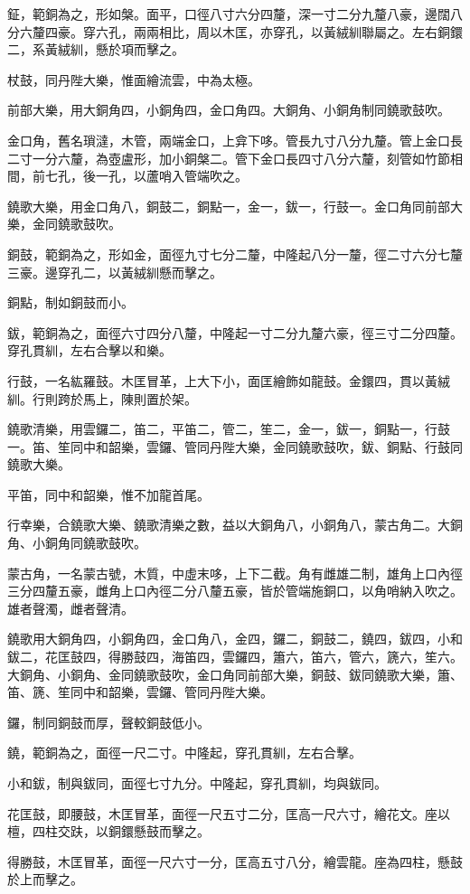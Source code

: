 \begin{pinyinscope}
鉦，範銅為之，形如槃。面平，口徑八寸六分四釐，深一寸二分九釐八豪，邊闊八分六釐四豪。穿六孔，兩兩相比，周以木匡，亦穿孔，以黃絨紃聯屬之。左右銅鐶二，系黃絨紃，懸於項而擊之。

杖鼓，同丹陛大樂，惟面繪流雲，中為太極。

前部大樂，用大銅角四，小銅角四，金口角四。大銅角、小銅角制同鐃歌鼓吹。

金口角，舊名瑣澾，木管，兩端金口，上弇下哆。管長九寸八分九釐。管上金口長二寸一分六釐，為壺盧形，加小銅槃二。管下金口長四寸八分六釐，刻管如竹節相間，前七孔，後一孔，以蘆哨入管端吹之。

鐃歌大樂，用金口角八，銅鼓二，銅點一，金一，鈸一，行鼓一。金口角同前部大樂，金同鐃歌鼓吹。

銅鼓，範銅為之，形如金，面徑九寸七分二釐，中隆起八分一釐，徑二寸六分七釐三豪。邊穿孔二，以黃絨紃懸而擊之。

銅點，制如銅鼓而小。

鈸，範銅為之，面徑六寸四分八釐，中隆起一寸二分九釐六豪，徑三寸二分四釐。穿孔貫紃，左右合擊以和樂。

行鼓，一名紘羅鼓。木匡冒革，上大下小，面匡繪飾如龍鼓。金鐶四，貫以黃絨紃。行則跨於馬上，陳則置於架。

鐃歌清樂，用雲鑼二，笛二，平笛二，管二，笙二，金一，鈸一，銅點一，行鼓一。笛、笙同中和韶樂，雲鑼、管同丹陛大樂，金同鐃歌鼓吹，鈸、銅點、行鼓同鐃歌大樂。

平笛，同中和韶樂，惟不加龍首尾。

行幸樂，合鐃歌大樂、鐃歌清樂之數，益以大銅角八，小銅角八，蒙古角二。大銅角、小銅角同鐃歌鼓吹。

蒙古角，一名蒙古號，木質，中虛末哆，上下二截。角有雌雄二制，雄角上口內徑三分四釐五豪，雌角上口內徑二分八釐五豪，皆於管端施銅口，以角哨納入吹之。雄者聲濁，雌者聲清。

鐃歌用大銅角四，小銅角四，金口角八，金四，鑼二，銅鼓二，鐃四，鈸四，小和鈸二，花匡鼓四，得勝鼓四，海笛四，雲鑼四，簫六，笛六，管六，篪六，笙六。大銅角、小銅角、金同鐃歌鼓吹，金口角同前部大樂，銅鼓、鈸同鐃歌大樂，簫、笛、篪、笙同中和韶樂，雲鑼、管同丹陛大樂。

鑼，制同銅鼓而厚，聲較銅鼓低小。

鐃，範銅為之，面徑一尺二寸。中隆起，穿孔貫紃，左右合擊。

小和鈸，制與鈸同，面徑七寸九分。中隆起，穿孔貫紃，均與鈸同。

花匡鼓，即腰鼓，木匡冒革，面徑一尺五寸二分，匡高一尺六寸，繪花文。座以檀，四柱交趺，以銅鐶懸鼓而擊之。

得勝鼓，木匡冒革，面徑一尺六寸一分，匡高五寸八分，繪雲龍。座為四柱，懸鼓於上而擊之。


\end{pinyinscope}
